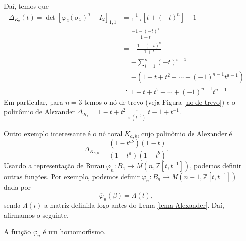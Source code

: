 	Daí, temos que
	\begin{align*}
    	\Delta_{K_b}(t) = \det[\varphi_2(\sigma_1)^n - I_2]_{1,1} &= \frac{1}{1+t}[t+(-t)^n] - 1 \\
    	&= \frac{-1 + (-t)^n}{1+t} \\
    	&= -\frac{1 - (-t)^n}{1+t} \\
    	&= -\sum_{i=1}^{n}(-t)^{i-1} \\
    	&= -(1-t+t^2-\cdots+(-1)^{n-1}t^{n-1}) \\
    	&\doteq 1-t+t^2-\cdots+(-1)^{n-1}t^{n-1}.
	\end{align*}
	Em particular, para $n = 3$ temos o nó de trevo (veja Figura \ref{no de trevo}) e o 
	polinômio de Alexander $\Delta_{K_b} = 1-t+t^2\underset{\times(t^{-1})}{\doteq} t-1+t^{-1}$.
	
	\par\vspace{0.3cm} Outro exemplo interessante é o nó toral $K_{a,b}$, cujo polinômio de Alexander é
	\begin{equation*}
	    \Delta_{K_{a,b}} = \frac{(1-t^{ab})(1-t)}{(1-t^a)(1-t^b)}.
	\end{equation*}
	Usando a representação de Burau $\varphi_n: B_n\to M(n, \mathbb{Z}[t,t^{-1}])$, 
	podemos definir outras funções. Por exemplo, podemos definir 
	$\overline{\varphi}_n: B_n\to M(n-1, \mathbb{Z}[t,t^{-1}])$ dada por
	\begin{equation*}
	    \overline{\varphi}_n(\beta) = \Lambda(t),
	\end{equation*} 
	sendo $\Lambda(t)$ a matriz definida logo antes do Lema \ref{lema Alexander}. Daí, afirmamos o seguinte.
	\begin{prop}
	\label{parecido com Burau}
		A função $\overline{\varphi}_n$ é um homomorfismo. %
	\end{prop}

